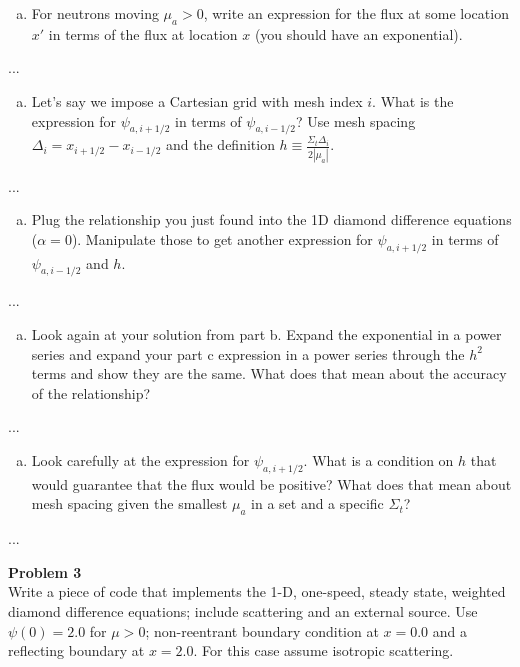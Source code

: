 \documentclass[10pt]{article}
\begin{document}
\begin{enumerate}[(a)]
\item For neutrons moving $\mu_a > 0$, write an expression for the flux at some location $x'$ in terms of the flux at location $x$ (you should have an exponential).
\end{enumerate}

...


\begin{enumerate}[(b)]
\item Let's say we impose a Cartesian grid with mesh index $i$. What is the expression for $\psi_{a,i+1/2}$ in terms of $\psi_{a,i-1/2}$? Use mesh spacing $\Delta_i = x_{i+1/2} - x_{i-1/2}$ and the definition $h \equiv \frac{\Sigma_t \Delta_i}{2|\mu_a|}$.
\end{enumerate}

...


\begin{enumerate}[(c)]
\item Plug the relationship you just found into the 1D diamond difference equations ($\alpha = 0$). Manipulate those to get another expression for
 $\psi_{a,i+1/2}$ in terms of $\psi_{a,i-1/2}$ and $h$.
\end{enumerate}

...


\begin{enumerate}[(d)]
\item Look again at your solution from part b. Expand the exponential in a power series and expand your part c expression in a power series through the $h^2$ terms and show they are the same. What does that mean about the accuracy of the relationship?
\end{enumerate}

...


\begin{enumerate}[(e)]
\item Look carefully at the expression for
$\psi_{a,i+1/2}$. What is a condition on $h$ that would guarantee that the flux would be positive? What does that mean about mesh spacing given the smallest $\mu_a$ in a set and a specific $\Sigma_t$?
\end{enumerate}

...






\newpage
\noindent \textbf{Problem 3}\\
Write a piece of code that implements the 1-D, one-speed, steady state, weighted diamond difference equations; include scattering and an external source. Use $\psi(0) = 2.0$ for $\mu > 0$; non-reentrant boundary condition at $x=0.0$ and a reflecting boundary at $x=2.0$. For this case assume isotropic scattering.
\end{document}
